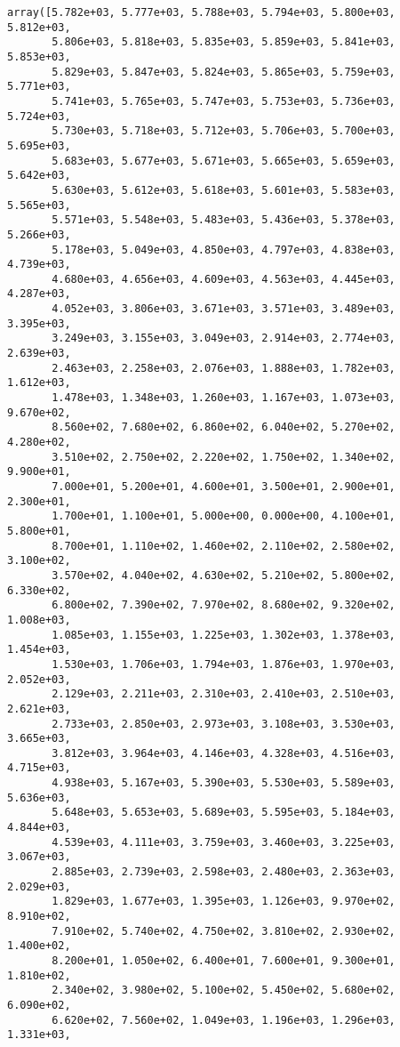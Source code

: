 \documentclass[11pt]{article}
\begin{document}
    \begin{verbatim}
array([5.782e+03, 5.777e+03, 5.788e+03, 5.794e+03, 5.800e+03, 5.812e+03,
       5.806e+03, 5.818e+03, 5.835e+03, 5.859e+03, 5.841e+03, 5.853e+03,
       5.829e+03, 5.847e+03, 5.824e+03, 5.865e+03, 5.759e+03, 5.771e+03,
       5.741e+03, 5.765e+03, 5.747e+03, 5.753e+03, 5.736e+03, 5.724e+03,
       5.730e+03, 5.718e+03, 5.712e+03, 5.706e+03, 5.700e+03, 5.695e+03,
       5.683e+03, 5.677e+03, 5.671e+03, 5.665e+03, 5.659e+03, 5.642e+03,
       5.630e+03, 5.612e+03, 5.618e+03, 5.601e+03, 5.583e+03, 5.565e+03,
       5.571e+03, 5.548e+03, 5.483e+03, 5.436e+03, 5.378e+03, 5.266e+03,
       5.178e+03, 5.049e+03, 4.850e+03, 4.797e+03, 4.838e+03, 4.739e+03,
       4.680e+03, 4.656e+03, 4.609e+03, 4.563e+03, 4.445e+03, 4.287e+03,
       4.052e+03, 3.806e+03, 3.671e+03, 3.571e+03, 3.489e+03, 3.395e+03,
       3.249e+03, 3.155e+03, 3.049e+03, 2.914e+03, 2.774e+03, 2.639e+03,
       2.463e+03, 2.258e+03, 2.076e+03, 1.888e+03, 1.782e+03, 1.612e+03,
       1.478e+03, 1.348e+03, 1.260e+03, 1.167e+03, 1.073e+03, 9.670e+02,
       8.560e+02, 7.680e+02, 6.860e+02, 6.040e+02, 5.270e+02, 4.280e+02,
       3.510e+02, 2.750e+02, 2.220e+02, 1.750e+02, 1.340e+02, 9.900e+01,
       7.000e+01, 5.200e+01, 4.600e+01, 3.500e+01, 2.900e+01, 2.300e+01,
       1.700e+01, 1.100e+01, 5.000e+00, 0.000e+00, 4.100e+01, 5.800e+01,
       8.700e+01, 1.110e+02, 1.460e+02, 2.110e+02, 2.580e+02, 3.100e+02,
       3.570e+02, 4.040e+02, 4.630e+02, 5.210e+02, 5.800e+02, 6.330e+02,
       6.800e+02, 7.390e+02, 7.970e+02, 8.680e+02, 9.320e+02, 1.008e+03,
       1.085e+03, 1.155e+03, 1.225e+03, 1.302e+03, 1.378e+03, 1.454e+03,
       1.530e+03, 1.706e+03, 1.794e+03, 1.876e+03, 1.970e+03, 2.052e+03,
       2.129e+03, 2.211e+03, 2.310e+03, 2.410e+03, 2.510e+03, 2.621e+03,
       2.733e+03, 2.850e+03, 2.973e+03, 3.108e+03, 3.530e+03, 3.665e+03,
       3.812e+03, 3.964e+03, 4.146e+03, 4.328e+03, 4.516e+03, 4.715e+03,
       4.938e+03, 5.167e+03, 5.390e+03, 5.530e+03, 5.589e+03, 5.636e+03,
       5.648e+03, 5.653e+03, 5.689e+03, 5.595e+03, 5.184e+03, 4.844e+03,
       4.539e+03, 4.111e+03, 3.759e+03, 3.460e+03, 3.225e+03, 3.067e+03,
       2.885e+03, 2.739e+03, 2.598e+03, 2.480e+03, 2.363e+03, 2.029e+03,
       1.829e+03, 1.677e+03, 1.395e+03, 1.126e+03, 9.970e+02, 8.910e+02,
       7.910e+02, 5.740e+02, 4.750e+02, 3.810e+02, 2.930e+02, 1.400e+02,
       8.200e+01, 1.050e+02, 6.400e+01, 7.600e+01, 9.300e+01, 1.810e+02,
       2.340e+02, 3.980e+02, 5.100e+02, 5.450e+02, 5.680e+02, 6.090e+02,
       6.620e+02, 7.560e+02, 1.049e+03, 1.196e+03, 1.296e+03, 1.331e+03,

\end{verbatim}
\end{document}
